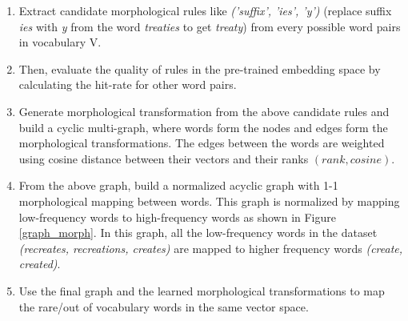 \begin{enumerate}
	\item Extract candidate morphological rules like \textit{('suffix', 'ies', 'y')} (replace suffix \textit{ies} with \textit{y} from the word \textit{treaties} to get \textit{treaty}) from every possible word pairs in vocabulary V. 
	\item Then, evaluate the quality of rules in the pre-trained embedding space by calculating the hit-rate for other word pairs.
	\item Generate morphological transformation from the above candidate rules and build a cyclic multi-graph, where words form the nodes and edges form the morphological transformations. The edges between the words are weighted using cosine distance between their vectors and their ranks $(rank, cosine)$.
	\item From the above graph, build a normalized acyclic graph with 1-1 morphological mapping between words. This graph is normalized by mapping low-frequency words to high-frequency words as shown in Figure \ref{graph_morph}. In this graph, all the low-frequency words in the dataset \textit{(recreates, recreations, creates)} are mapped to higher frequency words \textit{(create, created)}.
	\item Use the final graph and the learned morphological transformations to map the rare/out of vocabulary words in the same vector space.
\end{enumerate}

